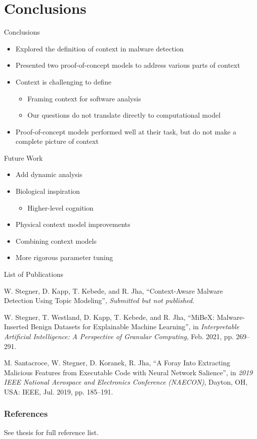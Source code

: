 \documentclass[handout,11pt]{beamer}
\begin{document}
	\section{Conclusions}
	\begin{frame}{Conclusions}
		\begin{itemize}
			\item Explored the definition of context in malware detection
			\item Presented two proof-of-concept models to address various parts of
				context
			\item Context is challenging to define
				\begin{itemize}
					\item Framing context for software analysis
					\item Our questions do not translate directly to computational model
				\end{itemize}
			\item Proof-of-concept models performed well at their task, but do not
				make a complete picture of context
		\end{itemize}
	\end{frame}
	\begin{frame}{Future Work}
		\begin{itemize}
			\item Add dynamic analysis
			\item Biological inspiration
				\begin{itemize}
					\item Higher-level cognition
				\end{itemize}
			\item Physical context model improvements
			\item Combining context models
			\item More rigorous parameter tuning
		\end{itemize}
	\end{frame}
	\begin{frame}{List of Publications}
		\footnotesize
		\par \hangindent=1cm W\@. Stegner, D\@. Kapp, T\@. Kebede, and R\@. Jha,
		``Context-Aware Malware Detection Using Topic Modeling'', \textit{Submitted
		but not published}.

		\par \hangindent=1cm W\@. Stegner, T\@. Westland, D\@. Kapp, T\@. Kebede,
		and R\@. Jha, ``MiBeX\@: Malware-Inserted Benign Datasets for Explainable
		Machine Learning'', in \textit{Interpretable Artificial Intelligence: A
		Perspective of Granular Computing}, Feb. 2021, pp\@. 269--291.

		\par \hangindent=0.5cm M\@. Santacroce, W\@. Stegner, D\@. Koranek, R\@.
		Jha, ``A Foray Into Extracting Malicious Features from Executable Code with
		Neural Network Salience'', in \textit{2019 IEEE National Aerospace and
		Electronics Conference (NAECON)}, Dayton, OH, USA\@: IEEE, Jul. 2019,
		pp\@. 185--191.

	\end{frame}

	\begin{frame}[allowframebreaks]
		\frametitle{References}
		See thesis for full reference list.
		\printbibliography{}
	\end{frame}
\end{document}

